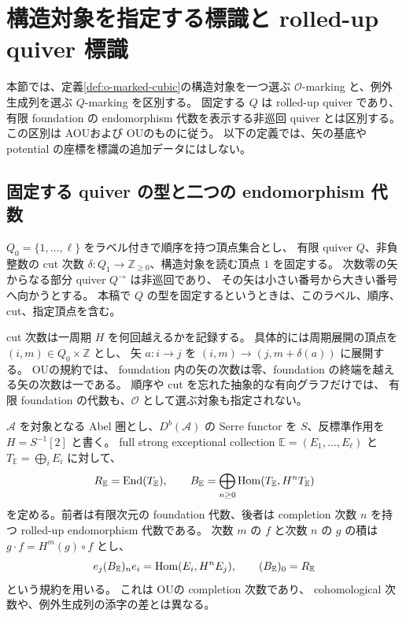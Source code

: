 \section{構造対象を指定する標識と rolled-up quiver 標識}
\label{sec:quiver-markings}

本節では、定義\ref{def:o-marked-cubic}の構造対象を一つ選ぶ
$\mathcal O$-marking と、例外生成列を選ぶ $Q$-marking を区別する。
固定する $Q$ は rolled-up quiver であり、有限 foundation の
endomorphism 代数を表示する非巡回 quiver とは区別する。
この区別は AOU\cite[\S\S4.2--4.5]{AOU}および
OU\cite[Definition 1.1(3), \S5]{OU2025}のものに従う。
以下の定義では、矢の基底や potential の座標を標識の追加データにはしない。

\subsection{固定する quiver の型と二つの endomorphism 代数}
\begin{definition}
\label{def:rooted-cut-quiver}
$Q_0=\{1,\ldots,\ell\}$ をラベル付きで順序を持つ頂点集合とし、
有限 quiver $Q$、非負整数の cut 次数
$\delta:Q_1\to\mathbb Z_{\ge0}$、構造対象を読む頂点 $1$ を固定する。
次数零の矢からなる部分 quiver $Q^{\to}$ は非巡回であり、
その矢は小さい番号から大きい番号へ向かうとする。
本稿で $Q$ の型を固定するというときは、このラベル、順序、cut、指定頂点を含む。
\end{definition}

cut 次数は一周期 $H$ を何回越えるかを記録する。
具体的には周期展開の頂点を $(i,m)\in Q_0\times\mathbb Z$ とし、
矢 $a:i\to j$ を
$ (i,m)\to(j,m+\delta(a)) $ に展開する。
OU\cite[Remark 5.4, (5.5)--(5.8)]{OU2025}の規約では、
foundation 内の矢の次数は零、foundation の終端を越える矢の次数は一である。
順序や cut を忘れた抽象的な有向グラフだけでは、
有限 foundation の代数も、$\mathcal O$ として選ぶ対象も指定されない。

$\mathcal A$ を対象となる Abel 圏とし、$D^b(\mathcal A)$ の
Serre functor を $S$、反標準作用を $H=S^{-1}[2]$ と書く。
full strong exceptional collection
$\mathbb E=(E_1,\ldots,E_\ell)$ と
$T_{\mathbb E}=\bigoplus_iE_i$ に対して、
\begin{equation}\label{eq:foundation-and-rolled-end}
 R_{\mathbb E}=\operatorname{End}(T_{\mathbb E}),\qquad
 B_{\mathbb E}
 =\bigoplus_{n\ge0}\operatorname{Hom}(T_{\mathbb E},H^nT_{\mathbb E})
\end{equation}
を定める。前者は有限次元の foundation 代数、後者は
completion 次数 $n$ を持つ rolled-up endomorphism 代数である。
次数 $m$ の $f$ と次数 $n$ の $g$ の積は
$g\cdot f=H^m(g)\circ f$ とし、
\[
 e_j(B_{\mathbb E})_ne_i=\operatorname{Hom}(E_i,H^nE_j),\qquad
 (B_{\mathbb E})_0=R_{\mathbb E}
\]
という規約を用いる。
これは OU\cite[(18)--(22)]{OUHelix}の completion 次数であり、
cohomological 次数や、例外生成列の添字の差とは異なる。

